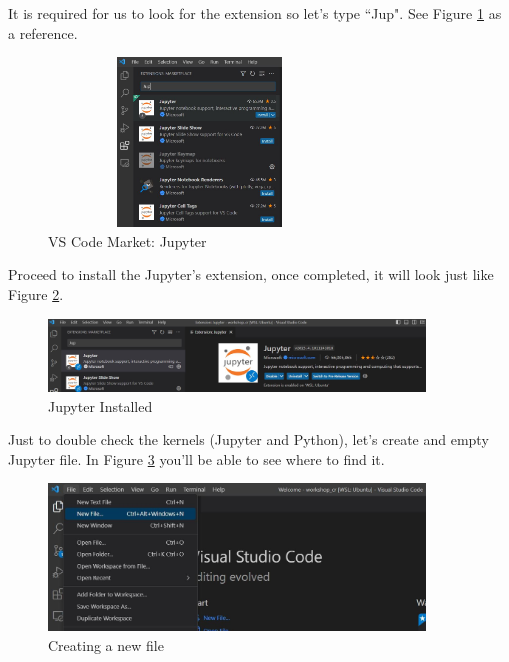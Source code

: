 \documentclass{assignment}
\begin{document}
It is required for us to look for the extension so let's type ``Jup". See Figure \ref{fig:market_jupyter} as a reference.

\begin{figure}[h]
 \centering 
    \includegraphics[width=8cm, height=4.5cm]{assets/vs_code_market_place_jupyter.JPG}
    \caption{VS Code Market: Jupyter}
    \label{fig:market_jupyter}
\end{figure}

Proceed to install the Jupyter's extension, once completed, it will look just like Figure \ref{fig:jup_installed}.

\begin{figure}[h]
 \centering 
    \includegraphics[width=10cm]{assets/vs_code_jupyter_installed.JPG}
    \caption{Jupyter Installed}
    \label{fig:jup_installed}
\end{figure}

Just to double check the kernels (Jupyter and Python), let's create and empty Jupyter file. In Figure \ref{fig:new_file_0} you'll be able to see where to find it.

\begin{figure}[h]
 \centering 
    \includegraphics[width=10cm]{assets/vs_code_new_file_1.JPG}
    \caption{Creating a new file}
    \label{fig:new_file_0}
\end{figure}

\newpage
\end{document}
